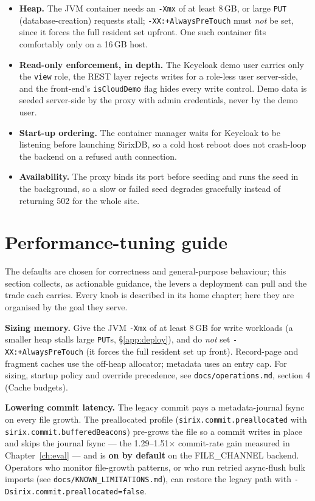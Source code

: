 \documentclass[11pt,a4paper,oneside]{report}
\theoremstyle{sirixthm}
\newcommand{\code}[1]{\texttt{#1}}
\begin{document}
\begin{itemize}[leftmargin=1.4em]
\item \textbf{Heap.} The JVM container needs an \code{-Xmx} of at least 8\,GB, or large \code{PUT}
  (database-creation) requests stall; \code{-XX:+AlwaysPreTouch} must \emph{not} be set, since it forces
  the full resident set upfront. One
  such container fits comfortably only on a 16\,GB host.
\item \textbf{Read-only enforcement, in depth.} The Keycloak demo user carries only the \code{view}
  role, the REST layer rejects writes for a role-less user server-side, and the front-end's
  \code{isCloudDemo} flag hides every write control. Demo data is seeded server-side by the proxy with
  admin credentials, never by the demo user.
\item \textbf{Start-up ordering.} The container manager waits for Keycloak to be listening before
  launching SirixDB, so a cold host reboot does not crash-loop the backend on a refused auth connection.
\item \textbf{Availability.} The proxy binds its port before seeding and runs the seed in the
  background, so a slow or failed seed degrades gracefully instead of returning 502 for the whole site.
\end{itemize}

\section{Performance-tuning guide}
\label{app:tuning}

The defaults are chosen for correctness and general-purpose behaviour; this section collects, as
actionable guidance, the levers a deployment can pull and the trade each carries. Every knob is described
in its home chapter; here they are organised by the goal they serve.

\textbf{Sizing memory.} Give the JVM \code{-Xmx} of at least 8\,GB for write workloads (a smaller heap
stalls large \code{PUT}s, \S\ref{app:deploy}), and do \emph{not} set
\code{-XX:+AlwaysPreTouch} (it forces the full resident set
up front). Record-page and fragment caches use the off-heap allocator; metadata uses an entry cap.
For sizing, startup policy and override precedence, see \code{docs/operations.md}, section 4
(Cache budgets).

\textbf{Lowering commit latency.} The legacy commit pays a metadata-journal fsync on every file
growth. The preallocated profile (\code{sirix.commit.preallocated} with
\code{sirix.commit.bufferedBeacons}) pre-grows the file so a commit writes in place and skips the
journal fsync — the 1.29--1.51$\times$ commit-rate gain measured in Chapter~\ref{ch:eval} — and is
\textbf{on by default} on the FILE\_CHANNEL backend. Operators who monitor file-growth patterns, or
who run retried async-flush bulk imports (see \code{docs/KNOWN\_LIMITATIONS.md}), can restore the
legacy path with \code{-Dsirix.commit.preallocated=false}.
\end{document}

